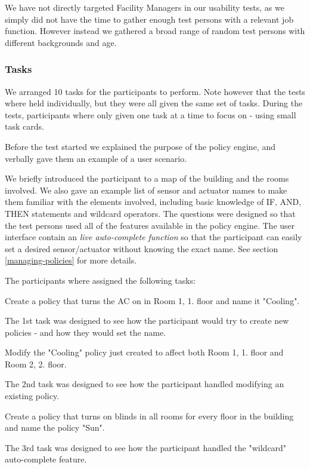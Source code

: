 We have not directly targeted Facility Managers in our usability tests, as we simply did not have the time to gather enough test persons with a relevant job function. However instead we gathered a broad range of random test persons with different backgrounds and age.

\subsubsection{Tasks}
We arranged 10 tasks for the participants to perform. Note however that the tests where held individually, but they were all given the same set of tasks. 
During the tests, participants where only given one task at a time to focus on - using small task cards.

Before the test started we explained the purpose of the policy engine, and verbally gave them an example of a user scenario.

We briefly introduced the participant to a map of the building and the rooms involved. We also gave an example list of sensor and actuator names to make them familiar with the elements involved, including basic knowledge of IF, AND, THEN statements and wildcard operators. The questions were designed so that the test persons used all of the features available in the policy engine. The user interface contain an \textit{live auto-complete function} so that the participant can easily set a desired sensor/actuator without knowing the exact name. See section \ref{managing-policies} for more details.

The participants where assigned the following tasks:

\begin{framed}
Create a policy that turns the AC on in Room 1, 1. floor and name it "Cooling".
\end{framed}
The 1st task was designed to see how the participant would try to create new policies - and how they would set the name.

\begin{framed}
Modify the "Cooling" policy just created to affect both Room 1, 1. floor and Room 2, 2. floor.
\end{framed}
The 2nd task was designed to see how the participant handled modifying an existing policy.

\begin{framed}
Create a policy that turns on blinds in all rooms for every floor in the building and name the policy "Sun".
\end{framed}
The 3rd task was designed to see how the participant handled the "wildcard" auto-complete feature.


